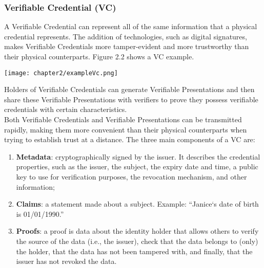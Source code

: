 \subsubsection{Verifiable Credential (VC)}
A Verifiable Credential\cite{site:w3cvc} can represent all of the same information that a physical 
credential represents. The addition of technologies, such as digital signatures, 
makes Verifiable Credentials more tamper-evident and more trustworthy than their 
physical counterparts. Figure 2.2 shows a VC example.\\
\begin{center}
    \vspace{-0.5cm}
    \texttt{[image: chapter2/exampleVc.png]}
    \vspace{-0.3cm}
\end{center}
Holders of Verifiable Credentials can generate Verifiable Presentations and then share 
these Verifiable Presentations with verifiers to prove they possess verifiable 
credentials with certain characteristics.\\
Both Verifiable Credentials and Verifiable Presentations can be transmitted rapidly, 
making them more convenient than their physical counterparts when trying to establish 
trust at a distance.
The three main components of a VC are:
\begin{enumerate}
    \item \textbf{Metadata}: cryptographically signed by the issuer. It describes the credential
    properties, such as the issuer, the subject, the expiry date and time, a public key 
    to use for verification purposes, the revocation mechanism, and other information;
    \item \textbf{Claims}: a statement made about a subject. Example: “Janice`s date of 
    birth is 01/01/1990.”
    \item \textbf{Proofs}: a proof is data about the identity holder that allows others 
    to verify the source of the data (i.e., the issuer), check that the data belongs to 
    (only) the holder, that the data has not been tampered with, and finally, that the 
    issuer has not revoked the data.
\end{enumerate}

